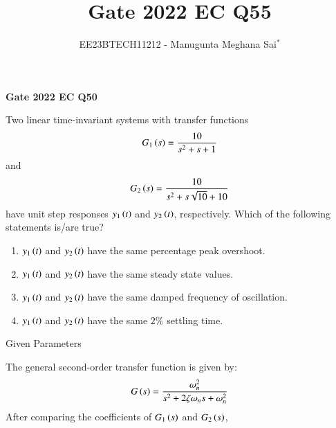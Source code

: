 \documentclass[journal,12pt,onecolumn]{IEEEtran}
\theoremstyle{remark}
\begin{document}
    
    
    \vspace{3cm}
    
    \title{Gate 2022 EC Q55}
    \author{EE23BTECH11212 - Manugunta Meghana Sai$^{*}$%
    }
    \maketitle
    \bigskip
    
    \renewcommand{\thefigure}{\theenumi}
    \renewcommand{\thetable}{\theenumi}
    
    \vspace{3cm}
    \textbf{Gate 2022 EC Q50} 
    
    Two linear time-invariant systems with transfer functions 
    \begin{align*}
    G_{1}\left(s\right) = \frac{10}{s^{2} + s + 1} 
    \end{align*}
    and
    \begin{align*}
    G_{2}\left(s\right) = \frac{10}{s^{2}+s\sqrt{10} +10}
    \end{align*}
    have unit step responses $y_{1}\left(t\right)$ and $y_{2}\left(t\right)$, respectively. Which of the following statements is/are true?
    \begin{enumerate}
    \item $y_{1}\left(t\right)$ and $y_{2}\left(t\right)$ have the same percentage peak overshoot.\\
    \item $y_{1}\left(t\right)$ and $y_{2}\left(t\right)$ have the same steady state values.\\
    \item $y_{1}\left(t\right)$ and $y_{2}\left(t\right)$ have the same damped frequency of oscillation.\\
    \item $y_{1}\left(t\right)$ and $y_{2}\left(t\right)$ have the same $2\%$ settling time.\\
    \end{enumerate}
    \solution
    \fi
    \begin{table}[h!]
 	\centering
 	\resizebox{6 cm}{!}{
 		
 	}
 	\caption{Given Parameters}
 	\label{tab:msmECgate50tab1}
     \end{table} 
    The general second-order transfer function is given by:
    \begin{align}
    G\left(s\right) = \frac{\omega_n^2}{s^2 + 2\zeta\omega_n s + \omega_n^2}
    \end{align}
    After comparing the coefficients of $G_{1}\left(s\right)$ and $G_{2}\left(s\right)$,
\end{document}
